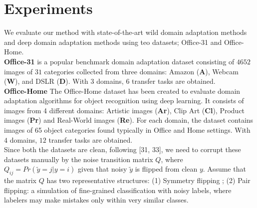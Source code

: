 \section{Experiments}
We evaluate our method with state-of-the-art wild domain adaptation methods and deep domain adaptation methods using teo datasets; Office-31 and Office-Home.\\

\textbf{Office-31} \cite{office} is a popular benchmark domain adaptation dataset consisting of $4652$ images of $31$ categories collected from three domains: Amazon (\textbf{A}), Webcam (\textbf{W}), and DSLR (\textbf{D}). With $3$ domains, $6$ transfer tasks are obtained.\\

\textbf{Office-Home} The Office-Home dataset has been created to evaluate domain adaptation algorithms for object recognition using deep learning. It consists of images from 4 different domains: Artistic images (\textbf{Ar}), Clip Art (\textbf{Cl}), Product images (\textbf{Pr}) and Real-World images (\textbf{Re}). For each domain, the dataset contains images of 65 object categories found typically in Office and Home settings. With $4$ domains, $12$ transfer tasks are obtained.\\

Since both the datasets are clean, following [31, 33], we need to corrupt these datasets manually by the noise transition matrix $Q$, where $Q_{ij} = Pr(\tilde{y} = j|y = i)$ given that noisy $\tilde{y}$ is flipped from clean $y$. Assume that the matrix $Q$ has two representative structures: (1) Symmetry flipping \cite{10.5555/2969239.2969241};
(2) Pair flipping: a simulation of fine-grained classification with noisy labels, where labelers may make mistakes only within very similar classes.


